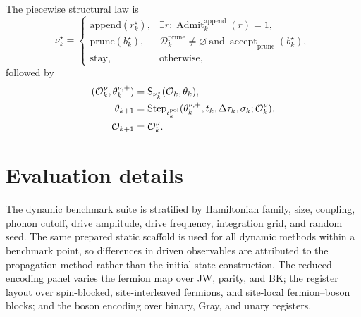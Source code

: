 \documentclass[
  reprint,
  amsmath,
  amssymb,
  aps,
  pra,
  nofootinbib,
  superscriptaddress,
  floatfix
]{revtex4-2}
\newcommand{\Oset}{\mathcal{O}}
\newcommand{\Dcal}{\mathcal{D}}
\newcommand{\stay}{\mathrm{stay}}
\newcommand{\app}{\mathrm{append}}
\newcommand{\prune}{\mathrm{prune}}
\begin{document}
The piecewise structural law is
\begin{equation}
\nu_k^\star=
\begin{cases}
\app(r_k^\star),&\exists r:\operatorname{Admit}_k^{\app}(r)=1,\\
\prune(b_k^\star),&\Dcal_k^{\prune}\neq\varnothing\
\text{and}\ \operatorname{accept}_{\prune}(b_k^\star),\\
\stay,&\text{otherwise,}
\end{cases}
\label{eq:hybrid_lane}
\end{equation}
followed by
\begin{equation}
\begin{aligned}
(\Oset_k^\nu,\theta_k^{\nu,+})&=\mathsf S_{\nu_k^\star}(\Oset_k,\theta_k),\\
\theta_{k+1}
&=\operatorname{Step}_{\iota_k^{\rm pol}}
(\theta_k^{\nu,+},t_k,\Delta\tau_k,\sigma_k;\Oset_k^\nu),\\
\Oset_{k+1}&=\Oset_k^\nu .
\end{aligned}
\label{eq:piecewise_smooth_law}
\end{equation}


\section{Evaluation details}
\label{app:evaluation_details}

The dynamic benchmark suite is stratified by Hamiltonian family, size, coupling, phonon cutoff, drive amplitude, drive frequency, integration grid, and random seed. The same prepared static scaffold is used for all dynamic methods within a benchmark point, so differences in driven observables are attributed to the propagation method rather than the initial-state construction. The reduced encoding panel varies the fermion map over JW, parity, and BK; the register layout over spin-blocked, site-interleaved fermions, and site-local fermion--boson blocks; and the boson encoding over binary, Gray, and unary registers.
\end{document}
